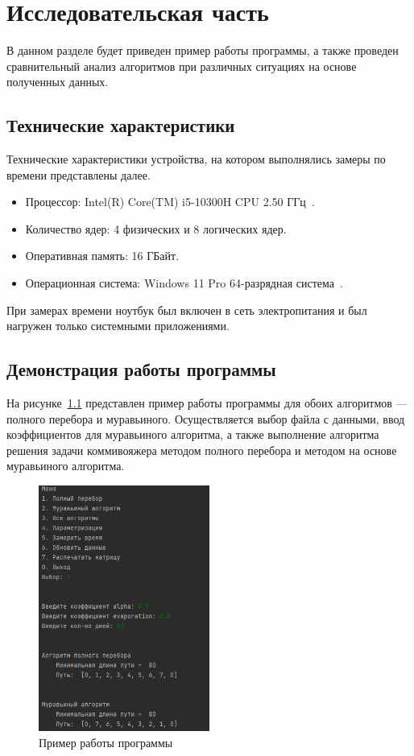 \chapter{Исследовательская часть}

В данном разделе будет приведен пример работы программы, а также проведен сравнительный анализ алгоритмов при различных ситуациях на основе полученных данных.

\section{Технические характеристики}

Технические характеристики устройства, на котором выполнялись замеры по времени представлены далее.

\begin{itemize}[label=---]
	\item Процессор: Intel(R) Core(TM) i5-10300H CPU 2.50 ГГц~\cite{intel}.
	\item Количество ядер: 4 физических и 8 логических ядер.
	\item Оперативная память: 16 ГБайт.
	\item Операционная система: Windows 11 Pro 64-разрядная система~\cite{windows}.
\end{itemize}

При замерах времени ноутбук был включен в сеть электропитания и был нагружен только системными приложениями.

\section{Демонстрация работы программы}

На рисунке~\ref{img:example}  представлен пример работы программы для обоих алгоритмов --- полного перебора и муравьиного. 
Осуществляется выбор файла с данными, ввод коэффициентов для муравьиного алгоритма, а также выполнение алгоритма решения задачи коммивояжера методом полного перебора и методом на основе муравьиного алгоритма.

\clearpage

\begin{figure}[h]
	\centering
	\includegraphics[width=0.5\textwidth]{img/example.png}
	\caption{Пример работы программы}
	\label{img:example}
\end{figure}

